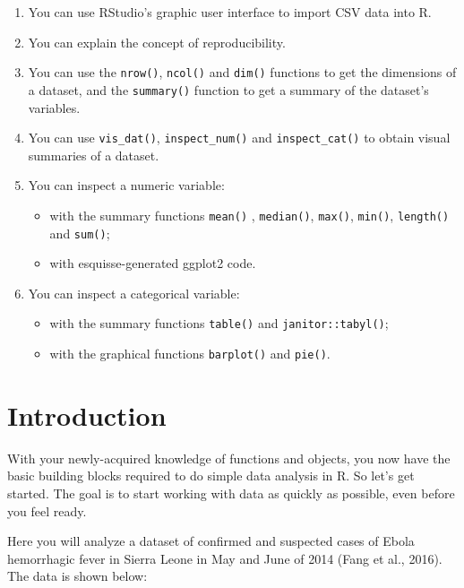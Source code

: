 \documentclass[
  letterpaper,
  DIV=11,
  numbers=noendperiod]{scrreprt}
\begin{document}
\begin{enumerate}
\def\labelenumi{\arabic{enumi}.}
\item
  You can use RStudio's graphic user interface to import CSV data into
  R.
\item
  You can explain the concept of reproducibility.
\item
  You can use the \texttt{nrow()}, \texttt{ncol()} and \texttt{dim()}
  functions to get the dimensions of a dataset, and the
  \texttt{summary()} function to get a summary of the dataset's
  variables.
\item
  You can use \texttt{vis\_dat()}, \texttt{inspect\_num()} and
  \texttt{inspect\_cat()} to obtain visual summaries of a dataset.
\item
  You can inspect a numeric variable:

  \begin{itemize}
  \item
    with the summary functions \texttt{mean()} , \texttt{median()},
    \texttt{max()}, \texttt{min()}, \texttt{length()} and
    \texttt{sum()};
  \item
    with esquisse-generated ggplot2 code.
  \end{itemize}
\item
  You can inspect a categorical variable:

  \begin{itemize}
  \item
    with the summary functions \texttt{table()} and
    \texttt{janitor::tabyl()};
  \item
    with the graphical functions \texttt{barplot()} and \texttt{pie()}.
  \end{itemize}
\end{enumerate}

\hypertarget{introduction-5}{%
\section{Introduction}\label{introduction-5}}

With your newly-acquired knowledge of functions and objects, you now
have the basic building blocks required to do simple data analysis in R.
So let's get started. The goal is to start working with data as quickly
as possible, even before you feel ready.

Here you will analyze a dataset of confirmed and suspected cases of
Ebola hemorrhagic fever in Sierra Leone in May and June of 2014 (Fang et
al., 2016). The data is shown below:
\end{document}
